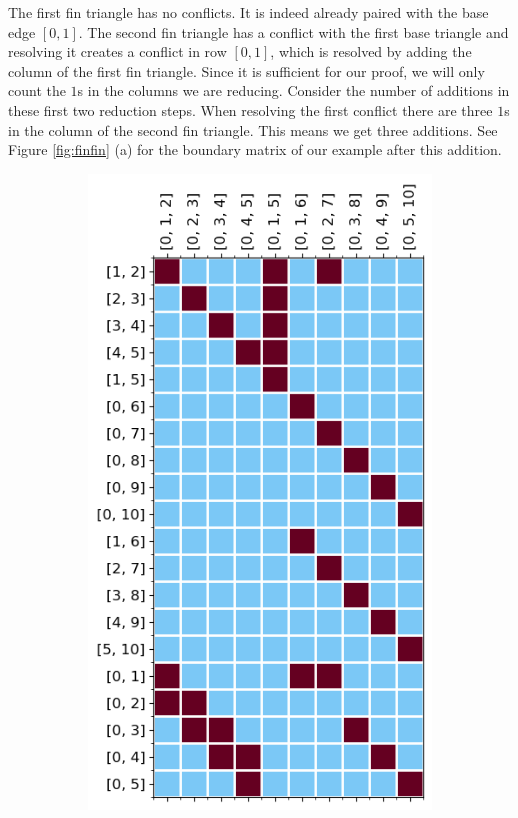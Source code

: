 The first fin triangle has no conflicts. It is indeed already paired with the base edge $[0,1]$. The second fin triangle has a conflict with the first base triangle and resolving it creates a conflict in row $[0,1]$, which is resolved by adding the column of the first fin triangle. Since it is sufficient for our proof, we will only count the $1$s in the columns we are reducing. Consider the number of additions in these first two reduction steps. When resolving the first conflict there are three $1$s in the column of the second fin triangle. This means we get three additions. See Figure \ref{fig:finfin} (a) for the boundary matrix of our example after this addition. 

\begin{figure}[H]
\noindent%
\centering%
\begin{subfigure}[l]{0.49\textwidth}
\begin{center}
\includegraphics[scale=0.6]{ConnectingMorsePersistence/Figures/Reduction/secondfin.png}

\end{center}
\end{subfigure}
\end{figure}
